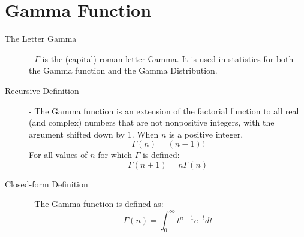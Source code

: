 \documentclass[11pt]{article}
\theoremstyle{definition}
\theoremstyle{remark}
\begin{document}
\begin{description}
\end{description}

\section{Gamma Function}
\begin{description}
\item[The Letter Gamma] - $\Gamma$ is the (capital) roman letter Gamma. It is used in statistics for both the Gamma function and the Gamma Distribution.
\item[Recursive Definition] - The Gamma function is an extension of the factorial function to all real (and complex) numbers that are not nonpositive integers, with the argument shifted down by 1. When $n$ is a positive integer, 
	\[\Gamma(n) = (n-1)!\]
For all values of $n$ for which $\Gamma$ is defined:
	\[\Gamma(n + 1) = n\Gamma(n)\]
\item[Closed-form Definition] - The Gamma function is defined as:
	\[\Gamma(n) = \int_0^\infty t^{n-1}e^{-t}dt\]
\end{description}
\end{document}
